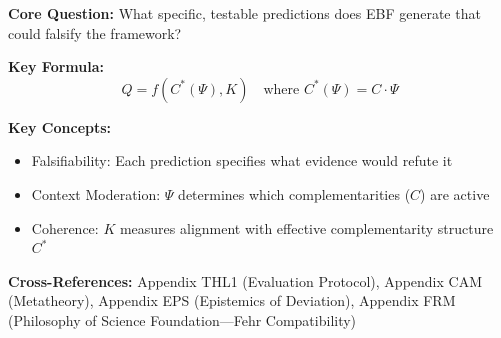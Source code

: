
\begin{abstract}
A framework that can explain everything explains nothing. This appendix addresses the Popperian challenge by deriving ten specific, falsifiable predictions from the EBF $(C, \Psi, C^*, K, Q)$ framework. Each prediction specifies the direction and magnitude of effects, identifies what evidence would refute it, and provides concrete empirical tests. Topics include cash transfer effectiveness, management practice transfer, information intervention asymmetry, financial-political crisis lags, recovery convexity, trade war hysteresis, technology-culture divergence, multi-level coherence conflicts, identity-economics non-substitutability, and coherent traps.
\end{abstract}


\begin{tcolorbox}[colback=blue!5!white, colframe=blue!75!black,
    title=Quick Reference: Falsifiable Predictions]

\textbf{Core Question:} What specific, testable predictions does EBF generate that could falsify the framework?

\textbf{Key Formula:}
\begin{equation}
Q = f(C^*(\Psi), K) \quad \text{where } C^*(\Psi) = C \cdot \Psi
\end{equation}

\textbf{Key Concepts:}
\begin{itemize}[nosep]
\item Falsifiability: Each prediction specifies what evidence would refute it
\item Context Moderation: $\Psi$ determines which complementarities ($C$) are active
\item Coherence: $K$ measures alignment with effective complementarity structure $C^*$
\end{itemize}

\textbf{Cross-References:} Appendix THL1 (Evaluation Protocol), Appendix CAM (Metatheory), Appendix EPS (Epistemics of Deviation), Appendix FRM (Philosophy of Science Foundation---Fehr Compatibility)
\end{tcolorbox}


